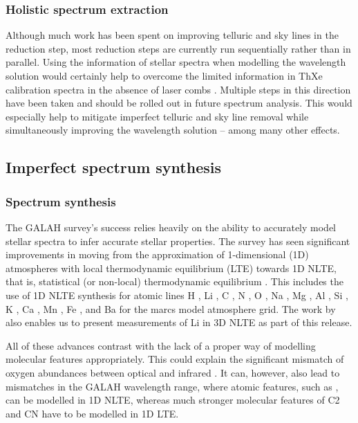 \documentclass[
  journal=pasa,
  manuscript=research-paper, %
  year=2024,
  volume=37
]{cup-journal}
\newcommand\ion[2]{\text{#1\,\textsc{\lowercase{#2}}}}	%
\begin{document}
\subsubsection{Holistic spectrum extraction}

Although much work has been spent on improving telluric and sky lines in the reduction step, most reduction steps are currently run sequentially rather than in parallel. Using the information of stellar spectra when modelling the wavelength solution would certainly help to overcome the limited information in ThXe calibration spectra in the absence of laser combs \citep{Kos2018b}. Multiple steps in this direction have been taken \citep{Saydjari2023} and should be rolled out in future spectrum analysis. This would especially help to mitigate imperfect telluric and sky line removal while simultaneously improving the wavelength solution -- among many other effects.

\subsection{Imperfect spectrum synthesis} \label{sec:caveats_synthesis}

\subsubsection{Spectrum synthesis}

The GALAH survey's success relies heavily on the ability to accurately model stellar spectra to infer accurate stellar properties. The survey has seen significant improvements in moving from the approximation of 1-dimensional (1D) atmospheres with local thermodynamic equilibrium (LTE) towards 1D NLTE, that is, statistical (or non-local) thermodynamic equilibrium \citep{Amarsi2020}. This includes the use of 1D NLTE synthesis for atomic lines  H \citep{Amarsi2018}, Li \citep{Lind2009, Wang2020}, C \citep{Amarsi2019}, N \citep{Amarsi2020b}, O \citep{Amarsi2018b}, Na \citep{Lind2011}, Mg \citep{Osorio2015}, Al \citep{Nordlander2017}, Si \citep{Amarsi2017}, K \citep{Reggiani2019}, Ca \citep{Osorio2019}, Mn \citep{Bergemann2019b}, Fe \citep{Amarsi2018, Amarsi2022}, and Ba \citep{Gallagher2020} for the {\sc marcs} model atmosphere grid. The work by \citet{Wang2024} also enables us to present measurements of Li in 3D NLTE as part of this release.

All of these advances contrast with the lack of a proper way of modelling molecular features appropriately. This could explain the significant mismatch of oxygen abundances between optical and infrared \citep[compare e.g.][]{Bensby2014, SDSSDR17}. It can, however, also lead to mismatches in the GALAH wavelength range, where atomic features, such as \ion{C}{I}, can be modelled in 1D NLTE, whereas much stronger molecular features of C2 and CN have to be modelled in 1D LTE.
\end{document}
